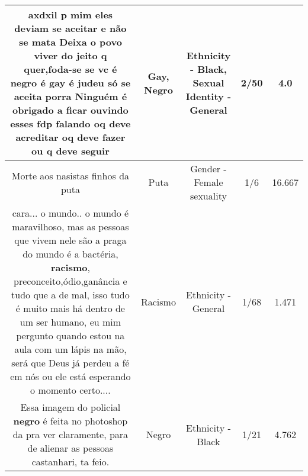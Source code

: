 \documentclass[11pt]{article}
\newlength\mylength
\begin{document}
\begin{center}
\begin{longtable}{|C{.65\mylength}|C{.30\mylength}|C{.12\mylength}|C{.12\mylength}|C{.12\mylength}|}
  \small axdxil p mim eles deviam se aceitar e não se mata Deixa o povo viver do jeito q quer,foda-se se vc é \textbf{negro} é \textbf{gay} é judeu só se aceita porra Ninguém é obrigado a ficar ouvindo esses fdp falando oq deve acreditar oq deve fazer ou q deve seguir\normalsize   & Gay, Negro & Ethnicity - Black, Sexual Identity - General & 2/50 & 4.0 \\  \hline
  \small Morte aos nasistas finhos da puta\normalsize   & Puta & Gender - Female sexuality & 1/6 & 16.667 \\  \hline
  \small cara... o mundo.. o mundo é maravilhoso, mas as pessoas que vivem nele são a praga do mundo é a bactéria, \textbf{racismo}, preconceito,ódio,ganância e tudo que a de mal, isso tudo é muito mais há dentro de um ser humano, eu mim pergunto quando estou na aula com um lápis na mão, será que Deus já perdeu a fé em nós ou ele está esperando o momento certo....\normalsize   & Racismo & Ethnicity - General & 1/68 & 1.471 \\  \hline
  \small Essa imagem do policial \textbf{negro} é feita no photoshop da pra ver claramente, para de alienar as pessoas castanhari, ta feio.\normalsize   & Negro & Ethnicity - Black & 1/21 & 4.762 \\  \hline

\end{longtable}
\end{center}
\end{document}
